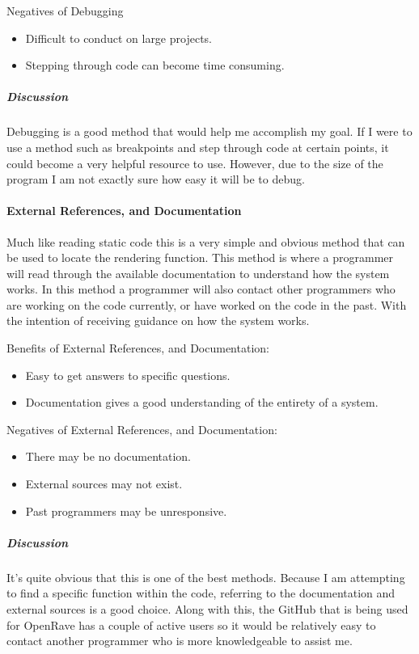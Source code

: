 Negatives of Debugging
\begin{itemize}
\item Difficult to conduct on large projects.
\item Stepping through code can become time consuming.
\end{itemize}

\subparagraph{Discussion}
Debugging is a good method that would help me accomplish my goal.
If I were to use a method such as breakpoints and step through code at certain points, it could become a very helpful resource to use.
However, due to the size of the program I am not exactly sure how easy it will be to debug.

\paragraph{External References, and Documentation}
Much like reading static code this is a very simple and obvious method that can be used to locate the rendering function.
This method is where a programmer will read through the available documentation to understand how the system works.
In this method a programmer will also contact other programmers who are working on the code currently, or have worked on the code in the past.
With the intention of receiving guidance on how the system works.

Benefits of External References, and Documentation:
\begin{itemize}
\item Easy to get answers to specific questions.
\item Documentation gives a good understanding of the entirety of a system.
\end{itemize}

Negatives of External References, and Documentation:
\begin{itemize}
\item There may be no documentation.
\item External sources may not exist.
\item Past programmers may be unresponsive.
\end{itemize}

\subparagraph{Discussion}
It's quite obvious that this is one of the best methods.
Because I am attempting to find a specific function within the code, referring to the documentation and external sources is a good choice.
Along with this, the GitHub that is being used for OpenRave has a couple of active users so it would be relatively easy to contact another programmer who is more knowledgeable to assist me.

